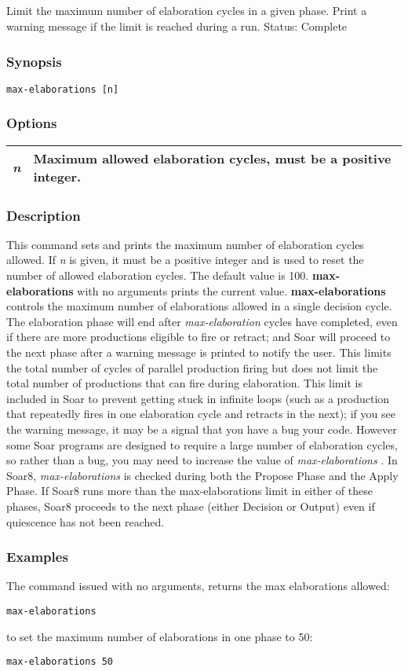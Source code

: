 \subsection{}
\label{max-elaborations}
Limit the maximum number of elaboration cycles in a given phase. Print a warning message if the limit is reached during a run. 
 Status: Complete
\subsubsection*{Synopsis}
\begin{verbatim}
max-elaborations [n]
\end{verbatim}
\subsubsection*{Options}
\begin{tabular}{|l|l|}
\hline 
\emph{n}
 & Maximum allowed elaboration cycles, must be a positive integer.  \\
 \hline 
\end{tabular}
\subsubsection*{Description}
 This command sets and prints the maximum number of elaboration cycles allowed. If \emph{n}
 is given, it must be a positive integer and is used to reset the number of allowed elaboration cycles. The default value is 100. \textbf{max-elaborations}
 with no arguments prints the current value. 
 \textbf{max-elaborations}
 controls the maximum number of elaborations allowed in a single decision cycle. The elaboration phase will end after \emph{max-elaboration}
 cycles have completed, even if there are more productions eligible to fire or retract; and Soar will proceed to the next phase after a warning message is printed to notify the user. This limits the total number of cycles of parallel production firing but does not limit the total number of productions that can fire during elaboration. 
 This limit is included in Soar to prevent getting stuck in infinite loops (such as a production that repeatedly fires in one elaboration cycle and retracts in the next); if you see the warning message, it may be a signal that you have a bug your code. However some Soar programs are designed to require a large number of elaboration cycles, so rather than a bug, you may need to increase the value of \emph{max-elaborations}
. 
 In Soar8, \emph{max-elaborations}
 is checked during both the Propose Phase and the Apply Phase. If Soar8 runs more than the max-elaborations limit in either of these phases, Soar8 proceeds to the next phase (either Decision or Output) even if quiescence has not been reached. 
\subsubsection*{Examples}
 The command issued with no arguments, returns the max elaborations allowed: \begin{verbatim}
max-elaborations 
\end{verbatim}
 to set the maximum number of elaborations in one phase to 50: \begin{verbatim}
max-elaborations 50
\end{verbatim}
